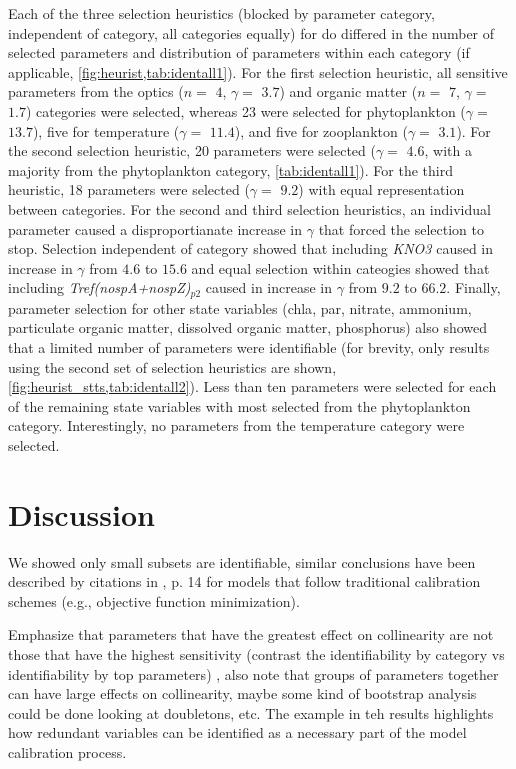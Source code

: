 \documentclass[letterpaper,12pt,oneside]{article}\usepackage[]{graphicx}\usepackage[]{color}
\begin{document}
Each of the three selection heuristics (blocked by parameter category, independent of category, all categories equally) for \ac{do} differed in the number of selected parameters and distribution of parameters within each category (if applicable, \cref{fig:heurist,tab:identall1}).  For the first selection heuristic, all sensitive parameters from the optics ($n = $ $4$, $\gamma =$  $3.7$) and organic matter ($n = $ $7$, $\gamma =$  $1.7$) categories were selected, whereas 23 were selected for phytoplankton ($\gamma = $ $13.7$), five for temperature ($\gamma = $ $11.4$), and five for zooplankton ($\gamma = $ $3.1$).  For the second selection heuristic, 20 parameters were selected ($\gamma = $ $4.6$, with a majority from the phytoplankton category, \cref{tab:identall1}).  For the third heuristic, 18 parameters were selected ($\gamma = $ $9.2$) with equal representation between categories. For the second and third selection heuristics, an individual parameter caused a disproportianate increase in $\gamma$ that forced the selection to stop.  Selection independent of category showed that including \textit{KNO3} caused in increase in $\gamma$ from $4.6$ to $15.6$ and equal selection within cateogies showed that including \textit{Tref(nospA+nospZ)$_{p2}$} caused in increase in $\gamma$ from $9.2$ to $66.2$.  Finally, parameter selection for other state variables (\ac{chla}, \ac{par}, nitrate, ammonium, particulate organic matter, dissolved organic matter, phosphorus) also showed that a limited number of parameters were identifiable (for brevity, only results using the second set of selection heuristics are shown, \cref{fig:heurist_stts,tab:identall2}).  Less than ten parameters were selected for each of the remaining state variables with most selected from the phytoplankton category.  Interestingly, no parameters from the temperature category were selected.  

\section{Discussion}


We showed only small subsets are identifiable, similar conclusions have been described by citations in \citep{Wagener01}, p. 14 for models that follow traditional calibration schemes (e.g., objective function minimization).

Emphasize that parameters that have the greatest effect on collinearity are not those that have the highest sensitivity (contrast the identifiability by category vs identifiability by top parameters)  , also note that groups of parameters together can have large effects on collinearity, maybe some kind of bootstrap analysis could be done looking at doubletons, etc. The example in teh results highlights how redundant variables can be identified as a necessary part of the model calibration process.
\end{document}
